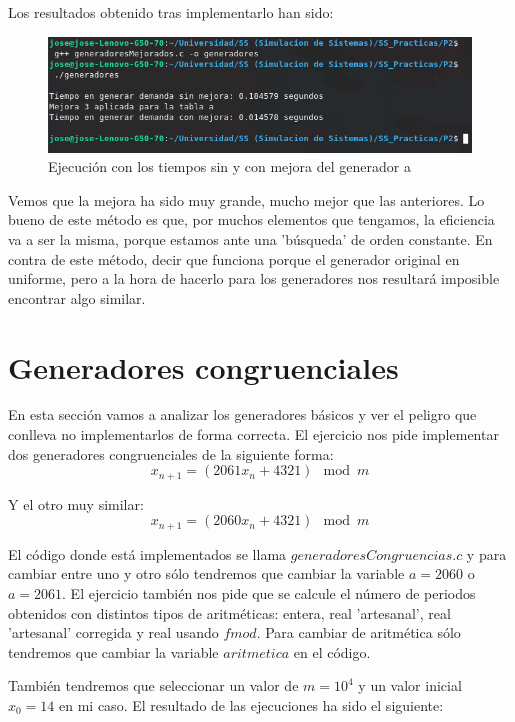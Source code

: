 \documentclass[11pt,a4paper]{report}
\begin{document}
Los resultados obtenido tras implementarlo han sido:
\begin{figure}[H]
\centering
\includegraphics[scale=0.7]{img/mejora3.png}
\caption{Ejecución con los tiempos sin y con mejora del generador a}
\end{figure}

Vemos que la mejora ha sido muy grande, mucho mejor que las anteriores. Lo bueno de este método es que, por muchos elementos que tengamos, la eficiencia va a ser
la misma, porque estamos ante una 'búsqueda' de orden constante. En contra de este método, decir que funciona porque el generador original en uniforme, pero a
la hora de hacerlo para los generadores nos resultará imposible encontrar algo similar.


\newpage

\section{Generadores congruenciales}

En esta sección vamos a analizar los generadores básicos y ver el peligro que conlleva no implementarlos de forma correcta. El ejercicio nos pide implementar
dos generadores congruenciales de la siguiente forma:
\begin{equation}
x_{n+1} = (2061x_n + 4321) \mod m
\end{equation}

Y el otro muy similar:
\begin{equation}
x_{n+1} = (2060x_n + 4321) \mod m
\end{equation}

El código donde está implementados se llama $generadoresCongruencias.c$ y para cambiar entre uno y otro sólo tendremos que cambiar la variable $a=2060$ o
$a=2061$. El ejercicio también nos pide que se calcule el número de periodos obtenidos con distintos tipos de aritméticas: entera, real 'artesanal', real
'artesanal' corregida y real usando $fmod$. Para cambiar de aritmética sólo tendremos que cambiar la variable $aritmetica$ en el código.

También tendremos que seleccionar un valor de $m=10^4$ y un valor inicial $x_0=14$ en mi caso. El resultado de las ejecuciones ha sido el siguiente:
\end{document}
